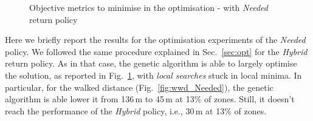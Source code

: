 \documentclass[review, letterpaper,3p, 11pt]{elsarticle}
\newcommand{\dg}[1]{{\color{orange}{[danilo: #1]}}}
\begin{document}
 
 \begin{figure}[h]
     \centering     %
     \caption{Objective metrics to minimise in the optimisation - with \textit{Needed} return policy}
    \label{fig:optimized_metrics_needed}
 \end{figure}

Here  we briefly report the results for the optimisation experiments of the \textit{Needed} policy.
We followed the same procedure explained in Sec.~\ref{sec:opt} for the \textit{Hybrid} return policy. As in that case, the genetic algorithm is able to largely optimise the solution, as reported in Fig.~\ref{fig:optimized_metrics_needed}, with \textit{local searches} stuck in local minima. 
In particular, for the walked distance (Fig.~\ref{fig:wwd_Needed}), the genetic algorithm is able lower it from 136\,m to 45\,m at 13\% of zones. Still, it doesn't reach the performance of the \textit{Hybrid} policy, i.e., 30\,m at 13\% of zones.


\end{document}
